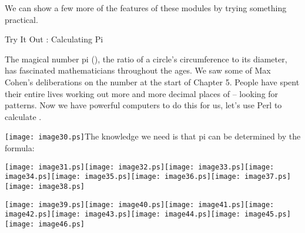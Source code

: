 \documentclass[a4paper,11pt]{book}
\begin{document}
\noindent 

\noindent We can show a few more of the features of these modules by trying something practical.

\noindent 

\noindent Try It Out : Calculating Pi

\noindent The magical number pi (), the ratio of a circle's circumference to its diameter, has fascinated mathematicians throughout the ages. We saw some of Max Cohen's deliberations on the number at the start of Chapter 5. People have spent their entire lives working out more and more decimal places of  -- looking for patterns. Now we have powerful computers to do this for us, let's use Perl to calculate .

\noindent 

\noindent \texttt{[image: image30.ps]}The knowledge we need is that pi can be determined by the formula:

\noindent 

\noindent \texttt{[image: image31.ps]}\texttt{[image: image32.ps]}\texttt{[image: image33.ps]}\texttt{[image: image34.ps]}\texttt{[image: image35.ps]}\texttt{[image: image36.ps]}\texttt{[image: image37.ps]}\texttt{[image: image38.ps]}

\noindent \texttt{[image: image39.ps]}\texttt{[image: image40.ps]}\texttt{[image: image41.ps]}\texttt{[image: image42.ps]}\texttt{[image: image43.ps]}\texttt{[image: image44.ps]}\texttt{[image: image45.ps]}\texttt{[image: image46.ps]}
\end{document}
